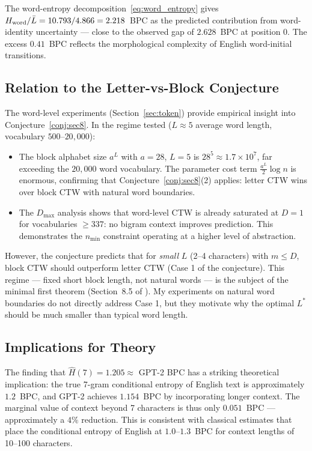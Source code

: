 \documentclass[11pt,a4paper]{article}
\newcommand{\bpcmin}{\widehat{H}}
\begin{document}
The word-entropy decomposition~\eqref{eq:word_entropy} gives
$H_{\rm word}/\bar{L} = 10.793/4.866 = 2.218$~BPC as the predicted
contribution from word-identity uncertainty —
close to the observed gap of $2.628$~BPC at position 0.
The excess $0.41$~BPC reflects the morphological complexity
of English word-initial transitions.

\subsection{Relation to the Letter-vs-Block Conjecture}

The word-level experiments (Section~\ref{sec:token}) provide
empirical insight into Conjecture~\ref{conj:sec8}.
In the regime tested ($L \approx 5$ average word length,
vocabulary $500$--$20{,}000$):
\begin{itemize}[leftmargin=1.5em]
  \item The block alphabet size $a^L$ with $a=28$, $L=5$ is
        $28^5 \approx 1.7 \times 10^7$, far exceeding the $20{,}000$
        word vocabulary.
        The parameter cost term $\frac{a^L}{2}\log n$ is enormous,
        confirming that Conjecture~\ref{conj:sec8}(2) applies:
        letter CTW wins over block CTW with natural word boundaries.

  \item The $D_{\max}$ analysis shows that word-level CTW is already
        saturated at $D=1$ for vocabularies $\ge 337$: no bigram context
        improves prediction.
        This demonstrates the $n_{\min}$ constraint operating at a higher
        level of abstraction.
\end{itemize}

However, the conjecture predicts that for \emph{small} $L$
(2--4 characters) with $m \le D$, block CTW should outperform
letter CTW (Case 1 of the conjecture).
This regime — fixed short block length, not natural words — is
the subject of the minimal first theorem (Section~8.5 of \citealt{Willems2026}).
My experiments on natural word boundaries do not directly address Case 1,
but they motivate why the optimal $L^*$ should be much smaller
than typical word length.

\subsection{Implications for Theory}

The finding that $\bpcmin(7) = 1.205 \approx$ GPT-2 BPC has a striking
theoretical implication:
the true 7-gram conditional entropy of English text is approximately
$1.2$~BPC, and GPT-2 achieves $1.154$~BPC by incorporating longer context.
The marginal value of context beyond 7 characters is thus
only $0.051$~BPC — approximately a $4\%$ reduction.
This is consistent with classical estimates that place the conditional
entropy of English at $1.0$--$1.3$~BPC for context lengths of
10--100 characters.
\end{document}

